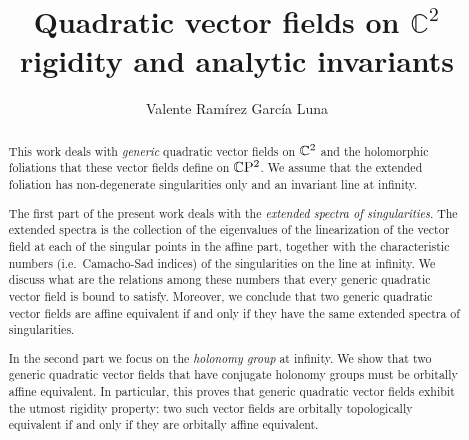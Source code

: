 \documentclass[phd,tocprelim]{cornell}
\title {\texorpdfstring{Quadratic vector fields on $\mathbb{C}^2$\\rigidity and analytic invariants}{Quadratic vector fields on C2 rigidity and analytic invariants}}
\author {Valente Ram\'{i}rez Garc\'{i}a Luna}
\begin{document}
\maketitle

\cleardoublepage{} %
\begin{abstract}
 This work deals with \textit{generic} quadratic vector fields on $\mathbb{C}^2$ and the holomorphic foliations that these vector fields define on $\mathbb{C}\mathrm{P}^2$. We assume that the extended foliation has non-degenerate singularities only and an invariant line at infinity.
 
 The first part of the present work deals with the \textit{extended spectra of singularities}. The extended spectra is the collection of the eigenvalues of the linearization of the vector field at each of the singular points in the affine part, together with the characteristic numbers (i.e.~Camacho-Sad indices) of the singularities on the line at infinity. We discuss what are the relations among these numbers that every generic quadratic vector field is bound to satisfy. Moreover, we conclude that two generic quadratic vector fields are affine equivalent if and only if they have the same extended spectra of singularities.
 
 In the second part we focus on the \textit{holonomy group} at infinity. We show that two generic quadratic vector fields that have conjugate holonomy groups must be orbitally affine equivalent. In particular, this proves that generic quadratic vector fields exhibit the utmost rigidity property: two such vector fields are orbitally topologically equivalent if and only if they are orbitally affine equivalent.

\begin{metadata} %
 
\end{metadata}
\end{abstract}


\end{document}
